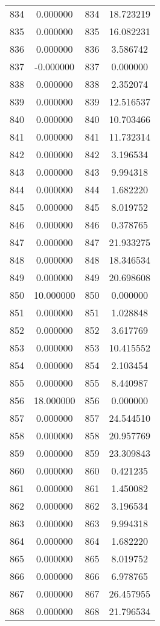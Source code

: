 \documentclass[12pt]{article}
\begin{document}
\begin{longtable}{@{}cccc@{}}
834 & 0.000000 & 834 & 18.723219 \\
835 & 0.000000 & 835 & 16.082231 \\
836 & 0.000000 & 836 & 3.586742 \\
837 & -0.000000 & 837 & 0.000000 \\
838 & 0.000000 & 838 & 2.352074 \\
839 & 0.000000 & 839 & 12.516537 \\
840 & 0.000000 & 840 & 10.703466 \\
841 & 0.000000 & 841 & 11.732314 \\
842 & 0.000000 & 842 & 3.196534 \\
843 & 0.000000 & 843 & 9.994318 \\
844 & 0.000000 & 844 & 1.682220 \\
845 & 0.000000 & 845 & 8.019752 \\
846 & 0.000000 & 846 & 0.378765 \\
847 & 0.000000 & 847 & 21.933275 \\
848 & 0.000000 & 848 & 18.346534 \\
849 & 0.000000 & 849 & 20.698608 \\
850 & 10.000000 & 850 & 0.000000 \\
851 & 0.000000 & 851 & 1.028848 \\
852 & 0.000000 & 852 & 3.617769 \\
853 & 0.000000 & 853 & 10.415552 \\
854 & 0.000000 & 854 & 2.103454 \\
855 & 0.000000 & 855 & 8.440987 \\
856 & 18.000000 & 856 & 0.000000 \\
857 & 0.000000 & 857 & 24.544510 \\
858 & 0.000000 & 858 & 20.957769 \\
859 & 0.000000 & 859 & 23.309843 \\
860 & 0.000000 & 860 & 0.421235 \\
861 & 0.000000 & 861 & 1.450082 \\
862 & 0.000000 & 862 & 3.196534 \\
863 & 0.000000 & 863 & 9.994318 \\
864 & 0.000000 & 864 & 1.682220 \\
865 & 0.000000 & 865 & 8.019752 \\
866 & 0.000000 & 866 & 6.978765 \\
867 & 0.000000 & 867 & 26.457955 \\
868 & 0.000000 & 868 & 21.796534 \\

\end{longtable}
\end{document}
